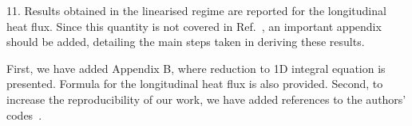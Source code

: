 \documentclass{article}
\begin{document}
\begin{quoting}
    11. Results obtained in the linearised regime are
    reported for the longitudinal heat flux. Since this
    quantity is not covered in Ref.~\cite{Luo2016}, an important
    appendix should be added, detailing the main steps
    taken in deriving these results.
\end{quoting}

First, we have added Appendix B, where reduction to 1D integral equation is presented.
Formula for the longitudinal heat flux is also provided.
Second, to increase the reproducibility of our work, we have added references
to the authors' codes~\cite{Rogozin2019hybrid,Rogozin2019couette}.

\printbibliography
\end{document}
